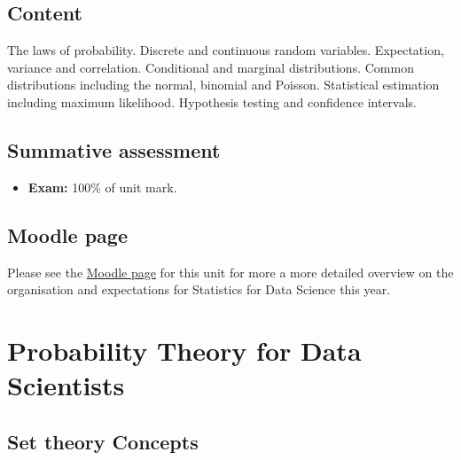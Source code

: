 \documentclass[
  letterpaper,
  DIV=11,
  numbers=noendperiod]{scrreport}
\providecommand{\tightlist}{%
  \setlength{\itemsep}{0pt}\setlength{\parskip}{0pt}}
\theoremstyle{definition}
\theoremstyle{plain}
\theoremstyle{definition}
\theoremstyle{plain}
\theoremstyle{remark}
\begin{document}
\section*{Content}\label{content}


The laws of probability. Discrete and continuous random variables.
Expectation, variance and correlation. Conditional and marginal
distributions. Common distributions including the normal, binomial and
Poisson. Statistical estimation including maximum likelihood. Hypothesis
testing and confidence intervals.

\section*{Summative assessment}\label{summative-assessment}


\begin{itemize}
\tightlist
\item
  \textbf{Exam:} 100\% of unit mark.
\end{itemize}

\section*{Moodle page}\label{moodle-page}


Please see the
\href{https://moodle.bath.ac.uk/course/view.php?id=62904}{Moodle page}
for this unit for more a more detailed overview on the organisation and
expectations for Statistics for Data Science this year.


\chapter{Probability Theory for Data
Scientists}\label{probability-theory-for-data-scientists}

\section{Set theory Concepts}\label{set-theory-concepts}
\end{document}
